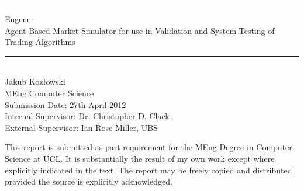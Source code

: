 \begin{titlepage}
\begin{center}
\vspace*{\fill}
\rule{\linewidth}{0.5mm}
\Huge{Eugene} \\[0.5cm]
\LARGE{Agent-Based Market Simulator for use in Validation and System Testing of Trading Algorithms}
\rule{\linewidth}{0.5mm}\\[2cm]

\large{Jakub Koz\l{}owski \\
MEng Computer Science \\
Submission Date: 27th April 2012 \\
Internal Supervisor: Dr. Christopher D. Clack \\
External Supervisor: Ian Rose-Miller, UBS}
\vspace*{\fill}


\null
\vfill
\normalsize{This report is submitted as part requirement for the MEng Degree in Computer Science at UCL. It is substantially the result of my own work except where explicitly indicated in the text. The report may be freely copied and distributed provided the source is explicitly acknowledged.}
\end{center}
\end{titlepage}


